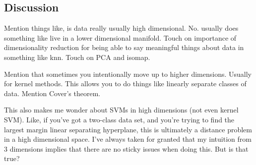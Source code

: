 \subsection{Discussion}
Mention things like, is data really usually high dimensional. No. usually does something like live in a lower dimensional manifold. Touch on importance of dimensionality reduction for being able to say meaningful things about data in something like knn. Touch on PCA and isomap. 

Mention that sometimes you intentionally move up to higher dimensions. Usually for kernel methods. This allows you to do things like linearly separate classes of data. Mention Cover's theorem. 

This also makes me wonder about SVMs in high dimensions (not even kernel SVM). Like, if you've got a two-class data set, and you're trying to find the largest margin linear separating hyperplane, this is ultimately a distance problem in a high dimensional space. I've always taken for granted that my intuition from 3 dimensions implies that there are no sticky issues when doing this. But is that true? 


